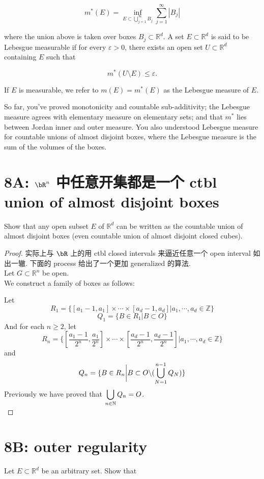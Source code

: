 \documentclass[lang=cn,11pt]{template}
\begin{document}
\[
m^*(E) = \inf_{E \subset \bigcup_{j=1}^{\infty} B_j} \sum_{j=1}^{\infty} |B_j|
\]

where the union above is taken over boxes $B_j \subset \mathbb{R}^d$. A set $E \subset \mathbb{R}^d$ is said to be Lebesgue measurable if for every $\varepsilon > 0$, there exists an open set $U \subset \mathbb{R}^d$ containing $E$ such that 

\[
m^*(U \setminus E) \leq \varepsilon.
\]

If $E$ is measurable, we refer to $m(E) = m^*(E)$ as the Lebesgue measure of $E$.

So far, you've proved monotonicity and countable sub-additivity; the Lebesgue measure agrees with elementary measure on elementary sets; and that $m^*$ lies between Jordan inner and outer measure. You also understood Lebesgue measure for countable unions of almost disjoint boxes, where the Lebesgue measure is the sum of the volumes of the boxes.

\section*{8A: $\bR^n$ 中任意开集都是一个 ctbl union of almost disjoint boxes}

Show that any open subset $E$ of $\mathbb{R}^d$ can be written as the countable union of almost disjoint boxes (even countable union of almost disjoint closed cubes).


\begin{proof}
实际上与 $\bR$ 上的用 ctbl closed intervals 来逼近任意一个 open interval 如出一辙. 下面的 process 给出了一个更加 generalized 的算法.\\
Let $G \subset \mathbb{R}^n$ be open. \\
We construct a family of boxes as follows: 

Let
$$
R_1 = \{ [a_1 - 1, a_1] \times \cdots \times [a_d -1, a_d] \bigg| a_1, \cdots, a_d \in \mathbb{Z} \}
$$
$$
Q_1 = \{B \in R_1 \bigg| B \subset O\}
$$
And for each $n \geq 2$, let
$$
R_n = \{  [\frac{a_1 - 1}{2^n}, \frac{a_1}{2^n}] \times \cdots \times  [\frac{a_d-1}{2^n}, \frac{a_d-1}{2^n}] \bigg| a_1, \cdots, a_d \in \mathbb{Z}\}
$$
and $$
Q_n = \{ B \in R_n \bigg| B \subset O \backslash (\displaystyle\bigcup_{N=1}^{n-1} Q_N) \}
$$
Previously we have proved that $\displaystyle\bigcup_{n \in \mathbb{N}} Q_n = O$.\\
\end{proof}


\section*{8B: outer regularity} 
Let $E \subset \mathbb{R}^d$ be an arbitrary set. Show that
\end{document}
